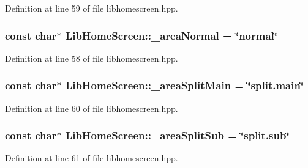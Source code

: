 Definition at line 59 of file libhomescreen.\+hpp.

\subsubsection[{\texorpdfstring{\+\_\+area\+Normal}{_areaNormal}}]{\setlength{\rightskip}{0pt plus 5cm}const char$\ast$ Lib\+Home\+Screen\+::\+\_\+area\+Normal = \char`\"{}normal\char`\"{}}\hypertarget{class_lib_home_screen_aac718b60b83c74e2b061f6f7f7ec3bf5}{}\label{class_lib_home_screen_aac718b60b83c74e2b061f6f7f7ec3bf5}


Definition at line 58 of file libhomescreen.\+hpp.

\subsubsection[{\texorpdfstring{\+\_\+area\+Split\+Main}{_areaSplitMain}}]{\setlength{\rightskip}{0pt plus 5cm}const char$\ast$ Lib\+Home\+Screen\+::\+\_\+area\+Split\+Main = \char`\"{}split.\+main\char`\"{}}\hypertarget{class_lib_home_screen_a7f201fc366146790520bf8d990f7b2eb}{}\label{class_lib_home_screen_a7f201fc366146790520bf8d990f7b2eb}


Definition at line 60 of file libhomescreen.\+hpp.

\subsubsection[{\texorpdfstring{\+\_\+area\+Split\+Sub}{_areaSplitSub}}]{\setlength{\rightskip}{0pt plus 5cm}const char$\ast$ Lib\+Home\+Screen\+::\+\_\+area\+Split\+Sub = \char`\"{}split.\+sub\char`\"{}}\hypertarget{class_lib_home_screen_ab4f54373b0681de11243152f01c48888}{}\label{class_lib_home_screen_ab4f54373b0681de11243152f01c48888}


Definition at line 61 of file libhomescreen.\+hpp.

